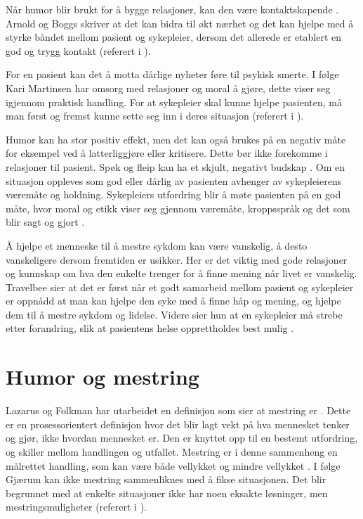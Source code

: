 Når humor blir brukt for å bygge relasjoner, kan den være kontaktskapende
\cite[s.~192]{spurkeland2002}. Arnold og Boggs skriver at det kan bidra til
økt nærhet og det kan hjelpe med å styrke båndet mellom pasient og sykepleier,
dersom det allerede er etablert en god og trygg kontakt (referert i
).

For en pasient kan det å motta dårlige nyheter føre til psykisk smerte. I følge
Kari Martinsen har omsorg med relasjoner og moral å gjøre, dette viser seg
igjennom praktisk handling. For at sykepleier skal kunne hjelpe pasienten, må
man  først og fremst kunne sette seg inn i deres situasjon (referert i
).

Humor kan ha stor positiv effekt, men det kan også brukes på en negativ måte
for eksempel ved å latterliggjøre eller kritisere. Dette bør ikke forekomme i
relasjoner til pasient. Spøk og fleip kan ha et skjult, negativt budskap
\cite[s.~246]{eide2008}. Om en situasjon oppleves som god eller dårlig av
pasienten avhenger av sykepleierens væremåte og holdning.  Sykepleiers
utfordring blir å møte pasienten på en god måte, hvor moral og etikk viser seg
gjennom væremåte, kroppsspråk og det som blir sagt og gjort
\cite[s.~127]{brinchmann2008}.

Å hjelpe et menneske til å mestre sykdom kan være vanskelig, å desto
vanskeligere dersom fremtiden er usikker. Her er det viktig med gode relasjoner
og kunnskap om hva den enkelte trenger for å finne mening når livet er
vanskelig. Travelbee sier at det er først når et godt samarbeid mellom pasient
og sykepleier er oppnådd at man kan hjelpe den syke med å finne håp og mening,
og hjelpe dem til å mestre sykdom og lidelse. Videre sier hun at en sykepleier
må strebe etter forandring, slik at pasientens helse opprettholdes best mulig
\cite[s.~30]{travelbee2001}.

\section{Humor og mestring}

Lazarus og Folkman har utarbeidet en definisjon som sier at mestring er
. Dette er en prosessorientert definisjon hvor
det blir lagt vekt på hva mennesket tenker og gjør, ikke hvordan mennesket er.
Den er knyttet opp til en bestemt utfordring, og skiller mellom handlingen og
utfallet. Mestring er i denne sammenheng en målrettet handling, som kan være
både vellykket og mindre vellykket \cite[s.~65]{heggen2010}. I følge Gjærum kan
ikke mestring sammenliknes med å fikse situasjonen. Det blir begrunnet med at
enkelte situasjoner ikke har noen eksakte løsninger, men mestringsmuligheter
(referert i ).

